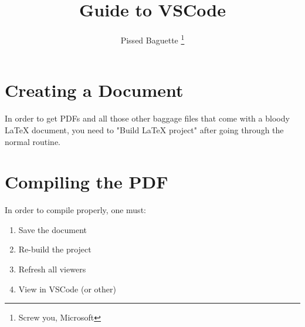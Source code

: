 \documentclass{article}
\title{Guide to VSCode}
\author{Pissed Baguette \thanks{Screw you, Microsoft}}
\date{}
\begin{document}
\maketitle

\section{Creating a Document}
In order to get PDFs and all those other baggage files that come with a bloody LaTeX document, you need to "Build LaTeX project" after going through the normal routine. 

\section{Compiling the PDF}
In order to compile properly, one must: 
\begin{enumerate}
    \item Save the document
    \item Re-build the project
    \item Refresh all viewers
    \item View in VSCode (or other)
\end{enumerate}
\end{document}
